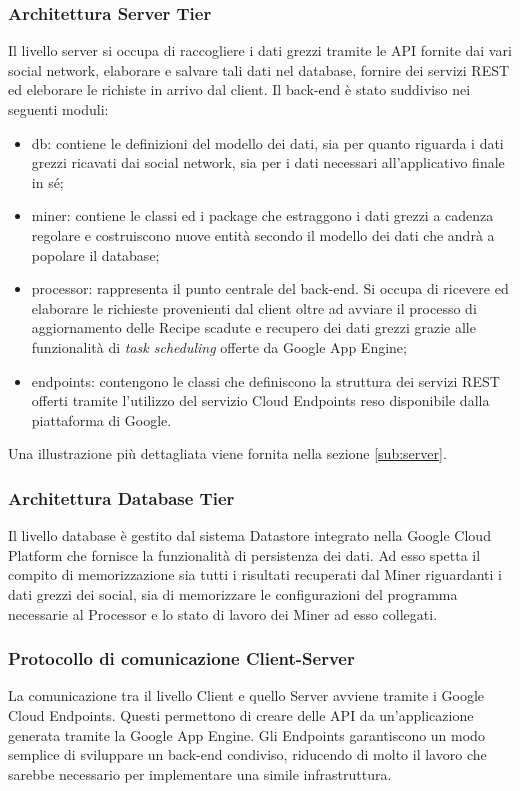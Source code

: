 		\subsubsection{Architettura Server Tier}
		Il livello server si occupa di raccogliere i dati grezzi tramite le API fornite dai vari social network, elaborare e salvare tali dati nel database, fornire dei servizi REST	ed eleborare le richiste in arrivo dal client. Il back-end è stato suddiviso nei seguenti moduli:
		\begin{itemize}
		  \item db: contiene le definizioni del modello dei dati, sia per quanto riguarda i dati grezzi ricavati dai social network, sia per i dati necessari all'applicativo finale in sé;
			\item miner: contiene le classi ed i package che estraggono i dati grezzi a cadenza regolare e costruiscono nuove entità secondo il modello dei dati che andrà a popolare il database;
			\item processor: rappresenta il punto centrale del back-end. Si occupa di ricevere ed elaborare le richieste provenienti dal client oltre ad avviare il processo di aggiornamento delle Recipe scadute e recupero dei dati grezzi grazie alle funzionalità di \textit{task scheduling} offerte da Google App Engine;
			\item endpoints: contengono le classi che definiscono la struttura dei servizi REST offerti tramite l'utilizzo del servizio Cloud Endpoints reso disponibile dalla piattaforma di Google.
		\end{itemize}
		Una illustrazione più dettagliata viene fornita nella sezione \ref{sub:server}.

		\subsubsection{Architettura Database Tier}
		Il livello database è gestito dal sistema Datastore integrato nella Google Cloud Platform che fornisce la funzionalità di persistenza dei dati. Ad esso spetta il compito di memorizzazione sia tutti i risultati recuperati dal Miner riguardanti i dati grezzi dei social, sia di memorizzare le configurazioni del programma necessarie al Processor e lo stato di lavoro dei Miner ad esso collegati.

		\subsubsection{Protocollo di comunicazione Client-Server}
		La comunicazione tra il livello Client e quello Server avviene tramite i Google Cloud Endpoints. Questi permettono di creare delle API da un'applicazione generata tramite la Google App Engine. Gli Endpoints garantiscono un modo semplice di sviluppare un back-end condiviso, riducendo di molto il lavoro che sarebbe necessario per implementare una simile infrastruttura.


